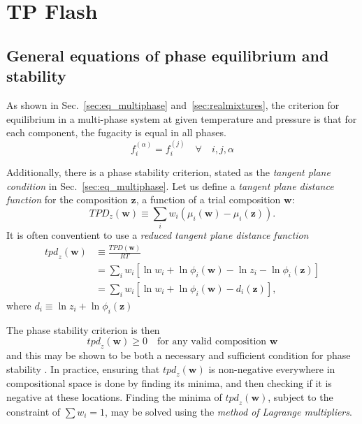 \documentclass[internal,english]{sintefmemo2012}
\newcommand*{\vektor}[1]{\boldsymbol{#1}}%
\begin{document}
\section{TP Flash}

\subsection{General equations of phase equilibrium and stability}
As shown in Sec.~\ref{sec:eq_multiphase} and~\ref{sec:realmixtures}, the criterion for equilibrium in a multi-phase system at given temperature 
and pressure is that for each component, the fugacity is equal in all phases.
\begin{equation}
  f_i^{(\alpha)} = f_i^{(j)} \quad \forall \quad i,j,\alpha
  \label{}
\end{equation}

Additionally, there is a phase stability criterion, stated as the \textit{tangent plane condition} in Sec.~\ref{sec:eq_multiphase}.
Let us define a \textit{tangent plane distance function} for the composition $\vektor{z}$, a function of a trial composition $\vektor{w}$:
\begin{equation}
  \mathit{TPD}_z(\vektor{w}) \equiv \sum_{i} w_i \left( \mu_i(\vektor{w}) - \mu_i(\vektor{z}) \right).
  \label{}
\end{equation}
It is often conventient to use a 
\textit{reduced tangent plane distance function}
\begin{align}
  \mathit{tpd}_z(\vektor{w}) &\equiv \frac{\mathit{TPD}(\vektor{w})}{RT} 
  \nonumber\\
  &= \sum_{i} w_i \left[ \ln w_i + \ln \phi_i(\vektor{w}) - \ln z_i - \ln \phi_i(\vektor{z}) \right]
  \nonumber\\
  &= \sum_{i} w_i \left[ \ln w_i + \ln \phi_i(\vektor{w}) - d_i(\vektor{z}) \right],
  \label{}
\end{align}
where $d_i \equiv \ln z_i + \ln \phi_i(\vektor{z}) $

The phase stability criterion is then
\begin{equation}
  \mathit{tpd}_z(\vektor{w}) \geq 0 \quad \text{for any valid composition $\vektor{w}$}
  \label{}
\end{equation}
and this may be shown to be both a necessary and sufficient condition for phase stability \cite{michelsen07}. 
In practice, ensuring that $\mathit{tpd}_z(\vektor{w})$ is non-negative everywhere in compositional space is done by finding its 
minima, and then checking if it is negative at these locations. Finding the minima of $\mathit{tpd}_z(\vektor{w})$, subject to the constraint of 
$\sum w_i = 1$, may be solved using the \textit{method of Lagrange multipliers}.
\end{document}
